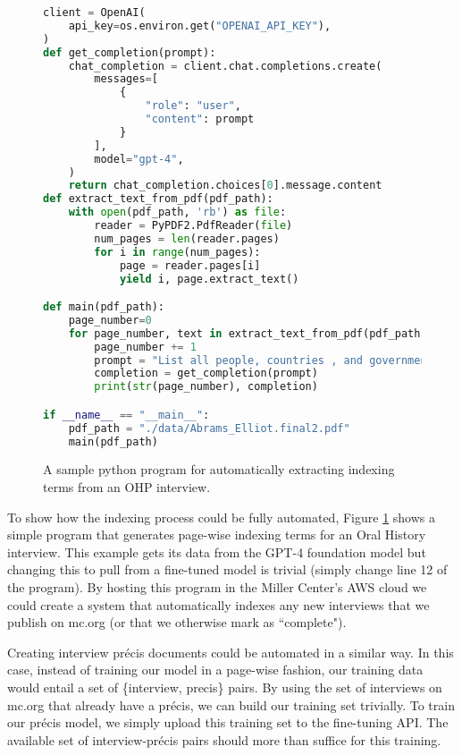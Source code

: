 \documentclass[12pt, oneside]{article}   	%
\begin{document}
\begin{figure}[htbp]
\begin{lstlisting}[language=Python]
client = OpenAI(
    api_key=os.environ.get("OPENAI_API_KEY"),
)
def get_completion(prompt):
    chat_completion = client.chat.completions.create(
        messages=[
            {
                "role": "user",
                "content": prompt
            }
        ],
        model="gpt-4",
    )
    return chat_completion.choices[0].message.content
def extract_text_from_pdf(pdf_path):
    with open(pdf_path, 'rb') as file:
        reader = PyPDF2.PdfReader(file)
        num_pages = len(reader.pages)
        for i in range(num_pages):
            page = reader.pages[i]
            yield i, page.extract_text()

def main(pdf_path):
    page_number=0
    for page_number, text in extract_text_from_pdf(pdf_path):
        page_number += 1
        prompt = "List all people, countries , and government agencies contained in the following text: " + text
        completion = get_completion(prompt)
        print(str(page_number), completion)

if __name__ == "__main__":
    pdf_path = "./data/Abrams_Elliot.final2.pdf"
    main(pdf_path)
\end{lstlisting}
\caption{A sample python program for automatically extracting indexing terms from an OHP interview.}
\label{figure.python}
\end{figure}

To show how the indexing process could be fully automated, Figure \ref{figure.python} shows a simple program that generates page-wise indexing terms for an Oral History interview.  This example gets its data from the GPT-4 foundation model but changing this to pull from a fine-tuned model is trivial (simply change line 12 of the program).  By hosting this program in the Miller Center's AWS cloud we could create a system that automatically indexes any new interviews that we publish on mc.org (or that we otherwise mark as ``complete").

Creating interview pr\'{e}cis documents could be automated in a similar way.  In this case, instead of training our model in a page-wise fashion, our training data would entail a set of \{interview, precis\} pairs.  By using the set of interviews on mc.org that already have a pr\'{e}cis, we can build our training set trivially.  To train our pr\'{e}cis model, we simply upload this training set to the fine-tuning API.  The available set of interview-pr\'{e}cis pairs should more than suffice for this training.
\end{document}
